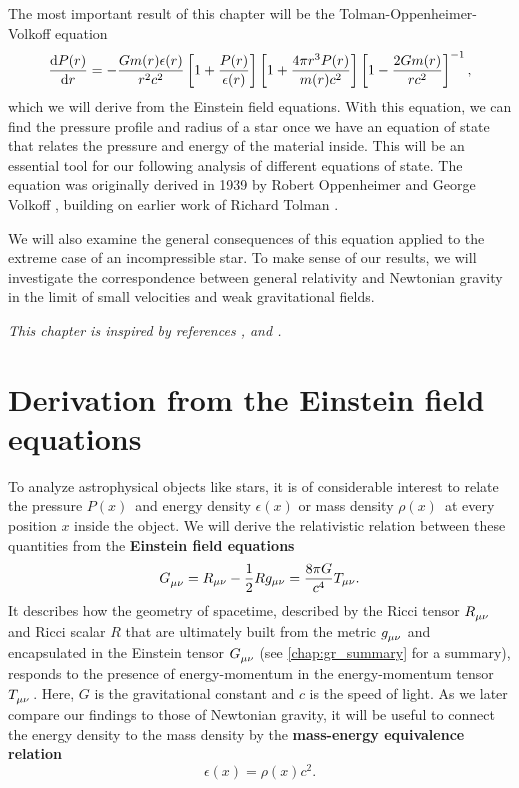 The most important result of this chapter will be the Tolman-Oppenheimer-Volkoff equation
\begin{equation*}
	\odv{P(r)}{r} = -\frac{G m(r) \epsilon(r)}{r^2 c^2} \left[ 1 + \frac{P(r)}{\epsilon(r)} \right] \left[ 1 + \frac{4 \pi r^3 P(r)}{m(r) c^2} \right] \left[ 1 - \frac{2 G m(r)}{r c^2} \right]^{-1} ,
\end{equation*}
which we will derive from the Einstein field equations.
With this equation, we can find the pressure profile and radius of a star once we have an equation of state that relates the pressure and energy of the material inside.
This will be an essential tool for our following analysis of different equations of state.
The equation was originally derived in 1939 by Robert Oppenheimer and George Volkoff \cite{ref:tov}, building on earlier work of Richard Tolman \cite{ref:tolman}.

We will also examine the general consequences of this equation applied to the extreme case of an incompressible star. 
To make sense of our results, we will investigate the correspondence between general relativity and Newtonian gravity in the limit of small velocities and weak gravitational fields.

\textit{This chapter is inspired by references \cite{ref:carroll}, \cite{ref:mtw} and \cite{ref:mika_gr_notes}.}

\section{Derivation from the Einstein field equations}
\label{sec:einstein_to_tov}

To analyze astrophysical objects like stars, it is of considerable interest to relate the pressure $P(x)$ and energy density $\epsilon(x)$ or mass density $\rho(x)$ at every position $x$ inside the object.
We will derive the relativistic relation between these quantities from the \textbf{Einstein field equations} \cite[equation 4.44]{ref:carroll}
\begin{equation}
	G\indices{_\mu_\nu} = R_{\mu \nu} - \frac{1}{2} R g_{\mu \nu} = \frac{8 \pi G}{c^4} T_{\mu \nu} .
	\label{eq:einstein}
\end{equation}
It describes how the geometry of spacetime, described by the Ricci tensor $R\indices{_\mu_\nu}$ and Ricci scalar $R$ that are ultimately built from the metric $g\indices{_\mu_\nu}$ and encapsulated in the Einstein tensor $G\indices{_\mu_\nu}$ (see \cref{chap:gr_summary} for a summary), responds to the presence of energy-momentum in the energy-momentum tensor $T\indices{_\mu_\nu}$.
Here, $G$ is the gravitational constant and $c$ is the speed of light.
As we later compare our findings to those of Newtonian gravity, it will be useful to connect the energy density to the mass density by the \textbf{mass-energy equivalence relation}
\begin{equation}
	\epsilon(x) = \rho(x) c^2 .
	\label{eq:tov:mass_energy_equivalence}
\end{equation}

